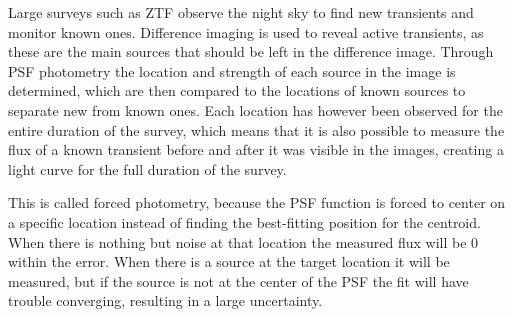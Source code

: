 \documentclass[a4paper,oneside,12pt, class=Latex/Classes/PhDthesisPSnPDF, crop=false]{standalone}
\begin{document}

Large surveys such as ZTF observe the night sky to find new transients and monitor known ones. Difference imaging is used to reveal active transients, as these are the main sources that should be left in the difference image. Through PSF photometry the location and strength of each source in the image is determined, which are then compared to the locations of known sources to separate new from known ones. Each location has however been observed for the entire duration of the survey, which means that it is also possible to measure the flux of a known transient before and after it was visible in the images, creating a light curve for the full duration of the survey.

This is called forced photometry, because the PSF function is forced to center on a specific location instead of finding the best-fitting position for the centroid. When there is nothing but noise at that location the measured flux will be 0 within the error. When there is a source at the target location it will be measured, but if the source is not at the center of the PSF the fit will have trouble converging, resulting in a large uncertainty.


\end{document}
